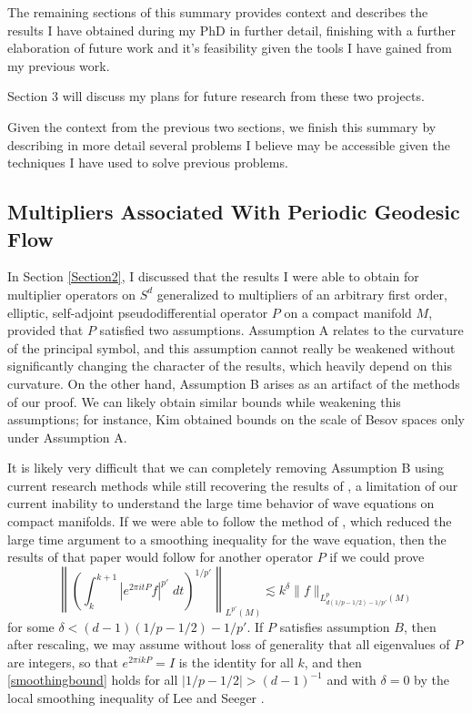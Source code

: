 \documentclass[11pt]{article}
\begin{document}
The remaining sections of this summary provides context and describes the results I have obtained during my PhD in further detail, finishing with a further elaboration of future work and it's feasibility given the tools I have gained from my previous work.

Section 3 will discuss my plans for future research from these two projects.

Given the context from the previous two sections, we finish this summary by describing in more detail several problems I believe may be accessible given the techniques I have used to solve previous problems.

\subsection{Multipliers Associated With Periodic Geodesic Flow}

In Section \ref{Section2}, I discussed that the results I were able to obtain for multiplier operators on $S^d$ generalized to multipliers of an arbitrary first order, elliptic, self-adjoint pseudodifferential operator $P$ on a compact manifold $M$, provided that $P$ satisfied two assumptions. Assumption A relates to the curvature of the principal symbol, and this assumption cannot really be weakened without significantly changing the character of the results, which heavily depend on this curvature. On the other hand, Assumption B arises as an artifact of the methods of our proof. We can likely obtain similar bounds while weakening this assumptions; for instance, Kim \cite{KimManifold} obtained bounds on the scale of Besov spaces only under Assumption A.

It is likely very difficult that we can completely removing Assumption B using current research methods while still recovering the results of \cite{DensonCharacterization}, a limitation of our current inability to understand the large time behavior of wave equations on compact manifolds. If we were able to follow the method of \cite{DensonThesis}, which reduced the large time argument to a smoothing inequality for the wave equation, then the results of that paper would follow for another operator $P$ if we could prove
%
\begin{equation} \label{smoothingbound}
	\left\| \left( \int_k^{k+1} |e^{2 \pi i t P} f|^{p'}\; dt \right)^{1/p'} \right\|_{L^{p'}(M)} \lesssim k^\delta \| f \|_{L^p_{d(1/p - 1/2) - 1/p'}(M)}
\end{equation}
%
for some $\delta < (d-1)(1/p - 1/2) - 1/p'$. If $P$ satisfies assumption $B$, then after rescaling, we may assume without loss of generality that all eigenvalues of $P$ are integers, so that $e^{2 \pi i k P} = I$ is the identity for all $k$, and then \eqref{smoothingbound} holds for all $|1/p - 1/2| > (d-1)^{-1}$ and with $\delta = 0$ by the local smoothing inequality of Lee and Seeger \cite{LeeSeeger}. 
\end{document}
